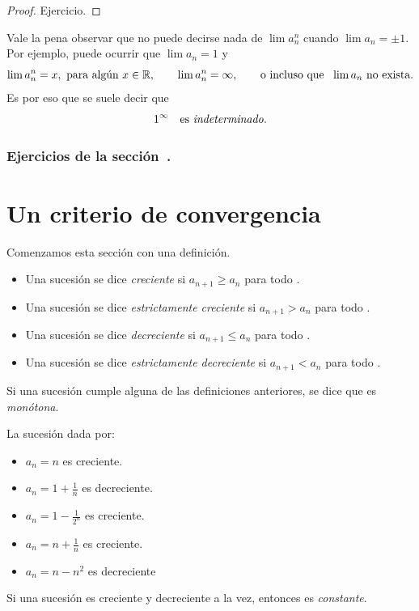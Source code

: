\begin{proof}
    Ejercicio.
\end{proof}

Vale la pena observar que no puede decirse nada de $\lim a_n^n$ cuando $\lim a_n = \pm 1$. 
Por ejemplo, puede ocurrir que $\lim a_n = 1$ y 
\[
\lim a_n^n = x, \text{ para algún $x\in\R$},
\qquad
\lim a_n^n = \infty,
\qquad
\text{o incluso que }\ 
\lim a_n \text{ no exista.}
\]
Es por eso que se suele decir que 
\[
1^\infty \quad\text{es \emph{indeterminado}}.
\]

\subsubsection*{Ejercicios de la sección~.}

\begin{enumerate}

\end{enumerate}

\section{Un criterio de convergencia}

Comenzamos esta sección con una definición.

\begin{definition}
    \begin{itemize}
    \item Una sucesión \sucan se dice \emph{creciente} si $a_{n+1} \ge a_n$ para todo \niN.
    \item Una sucesión \sucan se dice \emph{estrictamente creciente} si $a_{n+1} > a_n$ para todo \niN.

    \item Una sucesión \sucan se dice \emph{decreciente} si $a_{n+1} \le a_n$ para todo \niN.
    \item Una sucesión \sucan se dice \emph{estrictamente decreciente} si $a_{n+1} < a_n$ para todo \niN.
    
    \end{itemize}
    
    Si una sucesión cumple alguna de las definiciones anteriores, se dice que es \emph{monótona}.
\end{definition}

\begin{example}
La sucesión \sucan dada por:
\begin{itemize}
    \item $a_n = n$ es creciente.
    \item $a_n = 1+\frac1n$ es decreciente.
    \item $a_n = 1-\frac{1}{2^n}$ es creciente.
    \item $a_n = n+\frac1n$ es creciente.
    \item $a_n = n-n^2$ es decreciente
\end{itemize}
\end{example}
Si una sucesión es creciente y decreciente a la vez, entonces es \emph{constante}.


